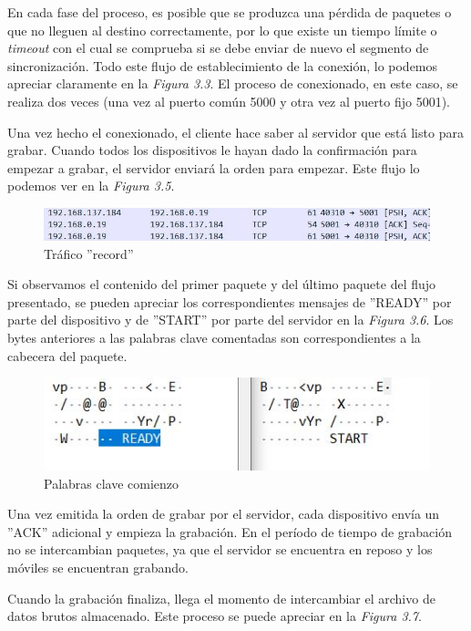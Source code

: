 \documentclass[a4paper,11pt]{book}
\begin{document}
En cada fase del proceso, es posible que se produzca una pérdida de paquetes o que no lleguen al destino correctamente, por lo que existe un tiempo límite o \textit{timeout} con el cual se comprueba si se debe enviar de nuevo el segmento de sincronización. Todo este flujo de establecimiento de la conexión, lo podemos apreciar claramente en la \textit{Figura 3.3}. El proceso de conexionado, en este caso, se realiza dos veces (una vez al puerto común 5000 y otra vez al puerto fijo 5001).

Una vez hecho el conexionado, el cliente hace saber al servidor que está listo para grabar. Cuando todos los dispositivos le hayan dado la confirmación para empezar a grabar, el servidor enviará la orden para empezar. Este flujo lo podemos ver en la \textit{Figura 3.5}.

\begin{figure}[hbtp]
\centering
\includegraphics[width = 15 cm]{FIGURAS/trafico_record.JPG}
\caption{Tráfico ''record''}
\end{figure}

Si observamos el contenido del primer paquete y del último paquete del flujo presentado, se pueden apreciar los correspondientes mensajes de ''READY'' por parte del dispositivo y de ''START'' por parte del servidor en la \textit{Figura 3.6}. Los bytes anteriores a las palabras clave comentadas son correspondientes a la cabecera del paquete.

\begin{figure}[hbtp]
\centering
\includegraphics[width = 8 cm]{FIGURAS/startready.JPG}
\caption{Palabras clave comienzo}
\end{figure}

Una vez emitida la orden de grabar por el servidor, cada dispositivo envía un ''ACK'' adicional y empieza la grabación. En el período de tiempo de grabación no se intercambian paquetes, ya que el servidor se encuentra en reposo y los móviles se encuentran grabando.

Cuando la grabación finaliza, llega el momento de intercambiar el archivo de datos brutos almacenado. Este proceso se puede apreciar en la \textit{Figura 3.7}.
\end{document}
